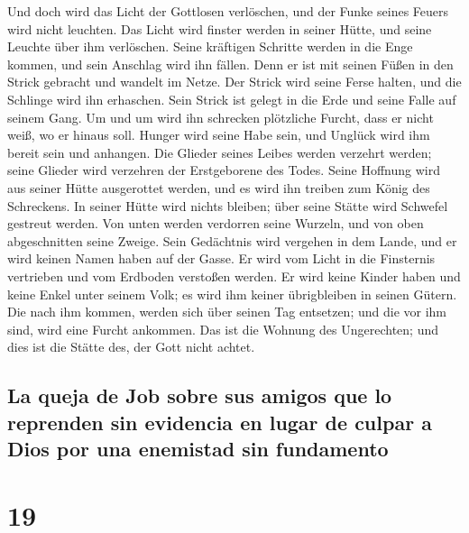 Und doch wird das Licht der Gottlosen verlöschen, und der
Funke seines Feuers wird nicht leuchten.  Das Licht wird
finster werden in seiner Hütte, und seine Leuchte über ihm verlöschen.
 Seine kräftigen Schritte werden in die Enge kommen, und
sein Anschlag wird ihn fällen.  Denn er ist mit seinen
Füßen in den Strick gebracht und wandelt im Netze.  Der
Strick wird seine Ferse halten, und die Schlinge wird ihn erhaschen.
 Sein Strick ist gelegt in die Erde und seine Falle auf
seinem Gang.  Um und um wird ihn schrecken plötzliche
Furcht, dass er nicht weiß, wo er hinaus soll.  Hunger
wird seine Habe sein, und Unglück wird ihm bereit sein und anhangen.
 Die Glieder seines Leibes werden verzehrt werden; seine
Glieder wird verzehren der Erstgeborene des Todes.  Seine
Hoffnung wird aus seiner Hütte ausgerottet werden, und es wird ihn
treiben zum König des Schreckens.  In seiner Hütte wird
nichts bleiben; über seine Stätte wird Schwefel gestreut werden.
 Von unten werden verdorren seine Wurzeln, und von oben
abgeschnitten seine Zweige.  Sein Gedächtnis wird
vergehen in dem Lande, und er wird keinen Namen haben auf der Gasse.
 Er wird vom Licht in die Finsternis vertrieben und vom
Erdboden verstoßen werden.  Er wird keine Kinder haben
und keine Enkel unter seinem Volk; es wird ihm keiner übrigbleiben in
seinen Gütern.  Die nach ihm kommen, werden sich über
seinen Tag entsetzen; und die vor ihm sind, wird eine Furcht ankommen.
 Das ist die Wohnung des Ungerechten; und dies ist die
Stätte des, der Gott nicht achtet.

\hypertarget{la-queja-de-job-sobre-sus-amigos-que-lo-reprenden-sin-evidencia-en-lugar-de-culpar-a-dios-por-una-enemistad-sin-fundamento}{%
\subsection{La queja de Job sobre sus amigos que lo reprenden sin
evidencia en lugar de culpar a Dios por una enemistad sin
fundamento}\label{la-queja-de-job-sobre-sus-amigos-que-lo-reprenden-sin-evidencia-en-lugar-de-culpar-a-dios-por-una-enemistad-sin-fundamento}}

\hypertarget{section-18}{%
\section{19}\label{section-18}}

